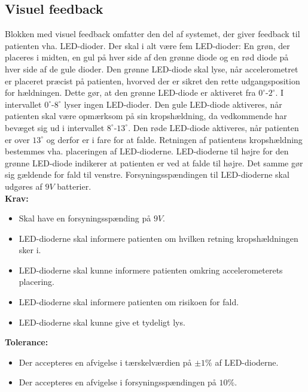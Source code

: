 \subsection{Visuel feedback}
Blokken med visuel feedback omfatter den del af systemet, der giver feedback til patienten vha. LED-dioder. Der skal i alt være fem LED-dioder: En grøn, der placeres i midten, en gul på hver side af den grønne diode og en rød diode på hver side af de gule dioder. Den grønne LED-diode skal lyse, når accelerometret er placeret præcist på patienten, hvorved der er sikret den rette udgangsposition for hældningen. Dette gør, at den grønne LED-diode er aktiveret fra $0^{\circ}$-$2^{\circ}$. I intervallet $0^{\circ}$-$8^{\circ}$ lyser ingen LED-dioder. Den gule LED-diode aktiveres, når patienten skal være opmærksom på sin kropshældning, da vedkommende har bevæget sig ud i intervallet $8^{\circ}$-$13^{\circ}$. Den røde LED-diode aktiveres, når patienten er over $13^{\circ}$ og derfor er i fare for at falde. Retningen af patientens kropshældning bestemmes vha. placeringen af LED-dioderne. LED-dioderne til højre for den grønne LED-diode indikerer at patienten er ved at falde til højre. Det samme gør sig gældende for fald til venstre. Forsyningsspændingen til LED-dioderne skal udgøres af $9V$ batterier.   
\\
\textbf{Krav:}
\begin{itemize}
	\item Skal have en forsyningsspænding på $9V$.
	\item LED-dioderne skal informere patienten om hvilken retning kropshældningen sker i.
	\item LED-dioderne skal kunne informere patienten omkring accelerometerets placering.
	\item LED-dioderne skal informere patienten om risikoen for fald.
	\item LED-dioderne skal kunne give et tydeligt lys.
\end{itemize}
\textbf{Tolerance:}
\begin{itemize}
	\item Der accepteres en afvigelse i tærskelværdien på $\pm1\%$ af LED-dioderne.
	\item Der accepteres en afvigelse i forsyningsspændingen på $10\%$.
\end{itemize}
